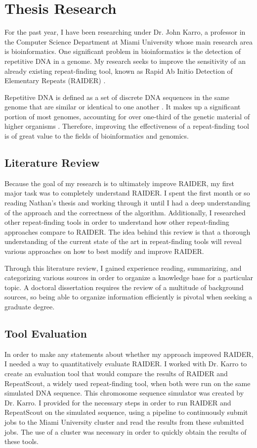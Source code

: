 \section*{Thesis Research}
For the past year, I have been researching under Dr. John Karro, a professor in the Computer Science Department at Miami University whose main research area is bioinformatics. One significant problem in bioinformatics is the detection of repetitive DNA in a genome. My research seeks to improve the sensitivity of an already existing repeat-finding tool, known as Rapid Ab Initio Detection of Elementary Repeats (RAIDER) \cite{figueroa2013raiderpaper}.

Repetitive DNA is defined as a set of discrete DNA sequences in the same genome that are similar or identical to one another \cite{treangen2012repetitive}. It makes up a significant portion of most genomes, accounting for over one-third of the genetic material of higher organisms \cite{britten1968repeated}. Therefore, improving the effectiveness of a repeat-finding tool is of great value to the fields of bioinformatics and genomics.

\subsection{Literature Review}
Because the goal of my research is to ultimately improve RAIDER, my first major task was to completely understand RAIDER. I spent the first month or so reading Nathan's thesis and working through it until I had a deep understanding of the approach and the correctness of the algorithm.  Additionally, I researched other repeat-finding tools in order to understand how other repeat-finding approaches compare to RAIDER. The idea behind this review is that a thorough understanding of the current state of the art in repeat-finding tools will reveal various approaches on how to best modify and improve RAIDER.

Through this literature review, I gained experience reading, summarizing, and categorizing various sources in order to organize a knowledge base for a particular topic. A doctoral dissertation requires the review of a multitude of background sources, so being able to organize information efficiently is pivotal when seeking a graduate degree.

\subsection{Tool Evaluation}
In order to make any statements about whether my approach improved RAIDER, I needed a way to quantitatively evaluate RAIDER. I worked with Dr. Karro to create an evaluation tool that would compare the results of RAIDER and RepeatScout, a widely used repeat-finding tool, when both were run on the same simulated DNA sequence. This chromosome sequence simulator was created by Dr. Karro. I provided for the necessary steps in order to run RAIDER and RepeatScout on the simulated sequence, using a pipeline to continuously submit jobs to the Miami University cluster and read the results from these submitted jobs. The use of a cluster was necessary in order to quickly obtain the results of these tools.

